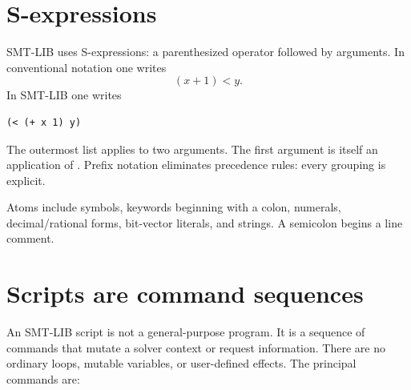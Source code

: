 \documentclass[10pt,letterpaper,oneside]{report}
\newcommand{\code}[1]{\texttt{\detokenize{#1}}}
\begin{document}
\section{S-expressions}

SMT-LIB uses S-expressions: a parenthesized operator followed by arguments. In conventional notation one writes
\[
  (x+1)<y.
\]
In SMT-LIB one writes

\begin{lstlisting}[language=SMTLib]
(< (+ x 1) y)
\end{lstlisting}

The outermost list applies \code{<} to two arguments. The first argument is itself an application of \code{+}. Prefix notation eliminates precedence rules: every grouping is explicit.

Atoms include symbols, keywords beginning with a colon, numerals, decimal/rational forms, bit-vector literals, and strings. A semicolon begins a line comment.

\section{Scripts are command sequences}

An SMT-LIB script is not a general-purpose program. It is a sequence of commands that mutate a solver context or request information. There are no ordinary loops, mutable variables, or user-defined effects. The principal commands are:
\end{document}
